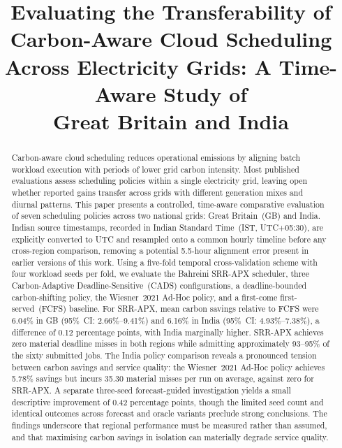 \documentclass[conference]{IEEEtran}
\begin{document}
\title{Evaluating the Transferability of Carbon-Aware Cloud Scheduling\\
Across Electricity Grids: A Time-Aware Study of\\
Great Britain and India}

\author{
}

\maketitle

\begin{abstract}
Carbon-aware cloud scheduling reduces operational emissions by aligning batch
workload execution with periods of lower grid carbon intensity. Most published
evaluations assess scheduling policies within a single electricity grid,
leaving open whether reported gains transfer across grids with different
generation mixes and diurnal patterns. This paper presents a controlled,
time-aware comparative evaluation of seven scheduling policies across two
national grids: Great Britain~(GB) and India. Indian source timestamps,
recorded in Indian Standard Time~(IST, UTC+05:30), are explicitly converted to
UTC and resampled onto a common hourly timeline before any cross-region
comparison, removing a potential 5.5-hour alignment error present in earlier
versions of this work. Using a five-fold temporal cross-validation scheme with
four workload seeds per fold, we evaluate the Bahreini SRR-APX scheduler,
three Carbon-Adaptive Deadline-Sensitive~(CADS) configurations, a
deadline-bounded carbon-shifting policy, the Wiesner~2021 Ad-Hoc policy, and a
first-come first-served~(FCFS) baseline. For SRR-APX, mean carbon savings
relative to FCFS were 6.04\% in GB (95\%~CI: 2.66\%--9.41\%) and 6.16\% in
India (95\%~CI: 4.93\%--7.38\%), a difference of 0.12 percentage points, with
India marginally higher. SRR-APX achieves zero material deadline misses in both
regions while admitting approximately 93--95\% of the sixty submitted jobs. The
India policy comparison reveals a pronounced tension between carbon savings and
service quality: the Wiesner~2021 Ad-Hoc policy achieves 5.78\% savings but
incurs 35.30 material misses per run on average, against zero for SRR-APX. A
separate three-seed forecast-guided investigation yields a small descriptive
improvement of 0.42 percentage points, though the limited seed count and
identical outcomes across forecast and oracle variants preclude strong
conclusions. The findings underscore that regional performance must be measured
rather than assumed, and that maximising carbon savings in isolation can
materially degrade service quality.
\end{abstract}
\end{document}
